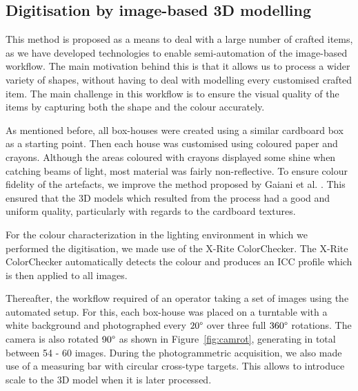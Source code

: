 \documentclass[acmlarge,screen,dvipsnames]{acmart}
\begin{document}


\color{blue}

\subsection{Digitisation by image-based 3D modelling}
This method is proposed as a means to deal with a large number of crafted items, as we have developed technologies to enable semi-automation of the image-based workflow. The main
motivation behind this is that it allows us to process a wider variety
of shapes, without having to deal with modelling every customised crafted item. The main challenge in this workflow is to ensure the visual quality of the items by capturing both the
shape and the colour accurately. 


As mentioned before, all box-houses were created using a similar cardboard box as a starting
point. Then each house was customised using coloured paper and crayons.
Although the areas coloured with crayons displayed some shine when catching
beams of light, most material was fairly non-reflective. To ensure colour fidelity of the
artefacts, we improve the method proposed by Gaiani et al. \cite{Gaiani_2017}. This ensured that the 3D models which resulted from the process had a good and uniform quality, particularly with regards to the cardboard
textures. 


For the colour characterization in the lighting environment in which we performed the
digitisation, we made use of the X-Rite ColorChecker. The X-Rite ColorChecker automatically detects the
colour and produces an ICC profile which is then applied to all
images.


Thereafter, the workflow required of an operator taking a set of images
using the automated setup. For this, each box-house was placed on a
turntable with a white background and photographed every $20\degree$
over three full $360\degree$ rotations. The camera is also 
rotated $90\degree$ as shown in Figure~\ref{fig:camrot}, generating in total between 54 - 60 images. 
During the photogrammetric acquisition, we also made use of a measuring bar with circular cross-type targets. This
allows to introduce scale to the 3D model when it is later processed.
\end{document}
